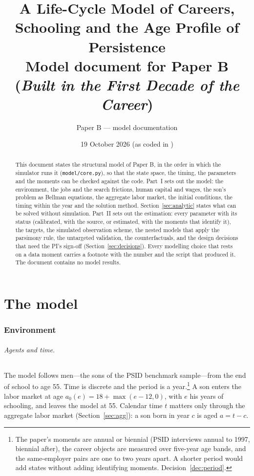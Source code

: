 \documentclass[11pt]{article}
\title{A Life-Cycle Model of Careers, Schooling and the Age Profile of Persistence\\[4pt]
\large Model document for Paper B (\emph{Built in the First Decade of the Career})}
\author{Paper B --- model documentation}
\date{19 October 2026 (as coded in \code{model/})}
\newcommand{\code}[1]{\texttt{#1}}
\newcommand{\1}{\mathbf{1}}
\begin{document}
\maketitle

\begin{abstract}
\noindent This document states the structural model of Paper B, in the order in which the simulator runs it
(\code{model/core.py}), so that the state space, the timing, the parameters and the moments can be checked against
the code.
Part~I sets out the model: the environment, the jobs and the search frictions, human capital and wages, the son's
problem as Bellman equations, the aggregate labor market, the initial conditions, the timing within the year and the
solution method. Section~\ref{sec:analytic} states what can be solved without simulation. Part~II sets out the estimation: every parameter with its status (calibrated, with the source, or
estimated, with the moments that identify it), the targets, the simulated observation scheme, the nested models that
apply the parsimony rule, the untargeted validation, the counterfactuals, and the design decisions that need the PI's
sign-off (Section~\ref{sec:decisions}). Every modelling choice that rests on a data moment carries a footnote with the
number and the script that produced it. The document contains no model results.
\end{abstract}

\tableofcontents
\newpage

\part{The model}

\section{Environment}\label{sec:env}

\paragraph{Agents and time.} The model follows men---the sons of the PSID benchmark sample---from the end of school
to age 55. Time is discrete and the period is a year.\footnote{The paper's moments are annual or biennial (PSID
interviews annual to 1997, biennial after), the career objects are measured over five-year age bands, and the
same-employer pairs are one to two years apart. A shorter period would add states without adding identifying moments.
Decision~\ref{dec:period}.} A son enters the labor market at age $a_0(e) = 18 + \max(e - 12, 0)$, with $e$ his years of
schooling, and leaves the model at 55. Calendar time $t$ matters only through the aggregate labor market
(Section~\ref{sec:agg}): a son born in year $c$ is aged $a = t - c$.
\end{document}
